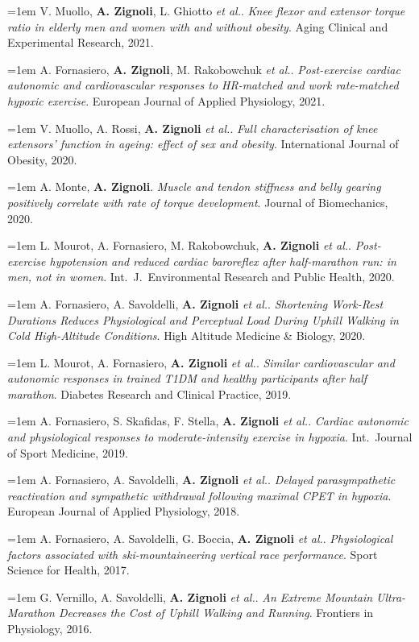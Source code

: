 \documentclass[10pt,a4paper]{article}
\newcommand{\pub}[3]{%
  \hangindent=1em\hangafter=1
  \small #1. \textit{#2}. #3.\par\vspace{3pt}%
}
\begin{document}
\pub{V. Muollo, \textbf{A. Zignoli}, L. Ghiotto \textit{et al.}}{Knee flexor and extensor torque ratio in elderly men and women with and without obesity}{Aging Clinical and Experimental Research, 2021}

\pub{A. Fornasiero, \textbf{A. Zignoli}, M. Rakobowchuk \textit{et al.}}{Post-exercise cardiac autonomic and cardiovascular responses to HR-matched and work rate-matched hypoxic exercise}{European Journal of Applied Physiology, 2021}

\pub{V. Muollo, A. Rossi, \textbf{A. Zignoli} \textit{et al.}}{Full characterisation of knee extensors' function in ageing: effect of sex and obesity}{International Journal of Obesity, 2020}

\pub{A. Monte, \textbf{A. Zignoli}}{Muscle and tendon stiffness and belly gearing positively correlate with rate of torque development}{Journal of Biomechanics, 2020}

\pub{L. Mourot, A. Fornasiero, M. Rakobowchuk, \textbf{A. Zignoli} \textit{et al.}}{Post-exercise hypotension and reduced cardiac baroreflex after half-marathon run: in men, not in women}{Int.\ J.\ Environmental Research and Public Health, 2020}

\pub{A. Fornasiero, A. Savoldelli, \textbf{A. Zignoli} \textit{et al.}}{Shortening Work-Rest Durations Reduces Physiological and Perceptual Load During Uphill Walking in Cold High-Altitude Conditions}{High Altitude Medicine \& Biology, 2020}

\pub{L. Mourot, A. Fornasiero, \textbf{A. Zignoli} \textit{et al.}}{Similar cardiovascular and autonomic responses in trained T1DM and healthy participants after half marathon}{Diabetes Research and Clinical Practice, 2019}

\pub{A. Fornasiero, S. Skafidas, F. Stella, \textbf{A. Zignoli} \textit{et al.}}{Cardiac autonomic and physiological responses to moderate-intensity exercise in hypoxia}{Int.\ Journal of Sport Medicine, 2019}

\pub{A. Fornasiero, A. Savoldelli, \textbf{A. Zignoli} \textit{et al.}}{Delayed parasympathetic reactivation and sympathetic withdrawal following maximal CPET in hypoxia}{European Journal of Applied Physiology, 2018}

\pub{A. Fornasiero, A. Savoldelli, G. Boccia, \textbf{A. Zignoli} \textit{et al.}}{Physiological factors associated with ski-mountaineering vertical race performance}{Sport Science for Health, 2017}

\pub{G. Vernillo, A. Savoldelli, \textbf{A. Zignoli} \textit{et al.}}{An Extreme Mountain Ultra-Marathon Decreases the Cost of Uphill Walking and Running}{Frontiers in Physiology, 2016}
\end{document}

